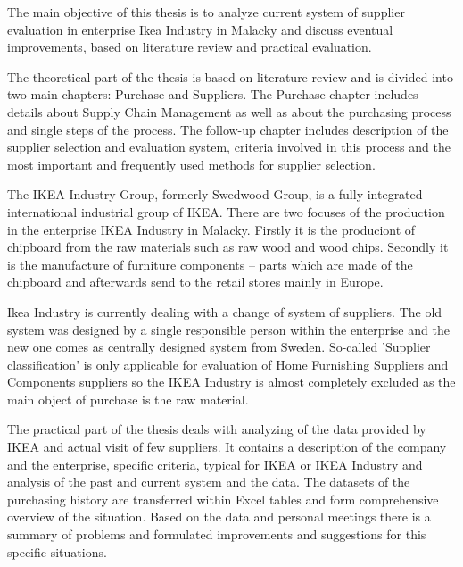 \documentclass[oneside,12pt]{article}%
\begin{document}
The main objective of this thesis is to analyze current system of supplier evaluation in enterprise Ikea Industry in Malacky and discuss eventual improvements, based on literature review and practical evaluation.\par
The theoretical part of the thesis is based on literature review and is divided into two main chapters: Purchase and Suppliers. The Purchase chapter includes details about Supply Chain Management as well as about the purchasing process and single steps of the process. The follow-up chapter includes description of the supplier selection and evaluation system, criteria involved in this process and the most important and frequently used methods for supplier selection.\par
The IKEA Industry Group, formerly Swedwood Group, is a fully integrated international industrial group of IKEA. There are two focuses of the production in the enterprise IKEA Industry in Malacky. Firstly it is the produciont of chipboard from the raw materials such as raw wood and wood chips. Secondly it is the manufacture of furniture components – parts which are made of the chipboard and afterwards send to the retail stores mainly in Europe.\par
Ikea Industry is currently dealing with a change of system of suppliers. The old system was designed by a single responsible person within the enterprise and the new one comes as centrally designed system from Sweden. So-called 'Supplier classification' is only applicable for evaluation of Home Furnishing Suppliers and Components suppliers so the IKEA Industry is almost completely excluded as the main object of purchase is the raw material.\par
The practical part of the thesis deals with analyzing of the data provided by IKEA and actual visit of few suppliers. It contains a description of the company and the enterprise, specific criteria, typical for IKEA or IKEA Industry and analysis of the past and current system and the data. The datasets of the purchasing history are transferred within Excel tables and form comprehensive overview of the situation. Based on the data and personal meetings there is a summary of problems and formulated improvements and suggestions for this specific situations.
\end{document}
